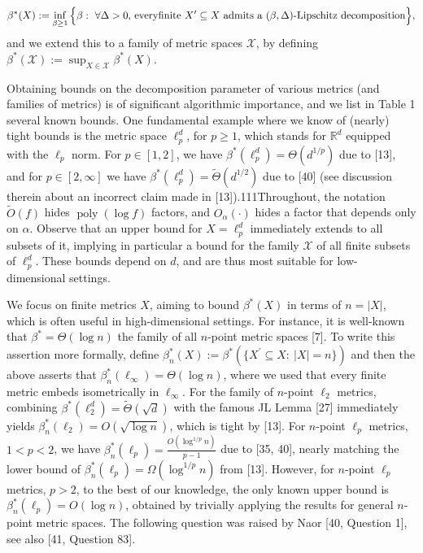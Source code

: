 \par
\[\begin{aligned}
\beta^{*}(X):=\inf_{\beta\geq 1}\Big{\{}\beta:\ \text{$\forall\Delta>0$, every%
 finite $X^{\prime}\subseteq X$
admits a $(\beta,\Delta)$-Lipschitz decomposition}\Big{\}},
\end{aligned}\]
and we extend this to a family of metric spaces $\mathcal{X}$, by defining $\beta^{*}(\mathcal{X}):=\sup_{X\in\mathcal{X}}\beta^{*}(X)$.
\par
\par
Obtaining bounds on the decomposition parameter of various metrics (and families of metrics) is of significant algorithmic importance, and we list in Table 1 several known bounds. One fundamental example where we know of (nearly) tight bounds is the metric space $\ell_{p}^{d}$, for $p\geq 1$, which stands for $\mathbb{R}^{d}$ equipped with the $\ell_{p}$ norm. For $p\in[1,2]$, we have $\beta^{*}(\ell_{p}^{d})=\Theta(d^{1/p})$ due to [13], and for $p\in[2,\infty]$ we have $\beta^{*}(\ell_{p}^{d})=\tilde{\Theta}(d^{1/2})$ due to [40] (see discussion therein about an incorrect claim made in [13]).111Throughout, the notation $\tilde{O}(f)$ hides $\operatorname{poly}(\log f)$ factors, and $O_{\alpha}(\cdot)$ hides a factor that depends only on $\alpha$. Observe that an upper bound for $X=\ell_{p}^{d}$ immediately extends to all subsets of it, implying in particular a bound for the family $\mathcal{X}$ of all finite subsets of $\ell_{p}^{d}$. These bounds depend on $d$, and are thus most suitable for low-dimensional settings.
\par
\par
We focus on finite metrics $X$, aiming to bound $\beta^{*}(X)$ in terms of $n=|X|$, which is often useful in high-dimensional settings. For instance, it is well-known that $\beta^{*}=\Theta(\log{n})$ the family of all $n$-point metric spaces [7]. To write this assertion more formally, define $\beta^{*}_{n}(X):=\beta^{*}(\{X^{\prime}\subseteq X:\ |X|=n\})$ and then the above asserts that $\beta^{*}_{n}(\ell_{\infty})=\Theta(\log n)$, where we used that every finite metric embeds isometrically in $\ell_{\infty}$. For the family of $n$-point $\ell_{2}$ metrics, combining $\beta^{*}(\ell_{2}^{d})=\tilde{\Theta}(\sqrt{d})$ with the famous JL Lemma [27] immediately yields $\beta^{*}_{n}(\ell_{2})=O(\sqrt{\log n})$, which is tight by [13]. For $n$-point $\ell_{p}$ metrics, $1<p<2$, we have $\beta^{*}_{n}(\ell_{p})=\frac{O(\log^{1/p}{n})}{p-1}$ due to [35, 40], nearly matching the lower bound of $\beta^{*}_{n}(\ell_{p})=\Omega(\log^{1/p}{n})$ from [13]. However, for $n$-point $\ell_{p}$ metrics, $p>2$, to the best of our knowledge, the only known upper bound is $\beta^{*}_{n}(\ell_{p})=O(\log n)$, obtained by trivially applying the results for general $n$-point metric spaces. The following question was raised by Naor [40, Question 1], see also [41, Question 83].
